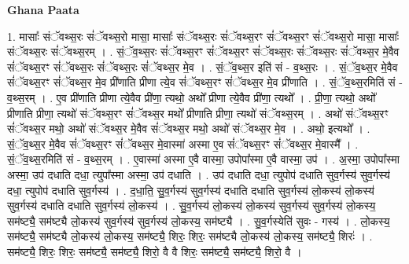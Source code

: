 \documentclass[17pt]{extarticle}
\begin{document}
\textbf{Ghana Paata } \newline

1. मासाः᳚ संॅवथ्स॒रः सं॑ॅवथ्स॒रो मासा॒ मासाः᳚ संॅवथ्स॒रः सं॑ॅवथ्स॒रꣳ सं॑ॅवथ्स॒रꣳ सं॑ॅवथ्स॒रो मासा॒ मासाः᳚ संॅवथ्स॒रः सं॑ॅवथ्स॒रम् । . सं॒ॅव॒थ्स॒रः सं॑ॅवथ्स॒रꣳ सं॑ॅवथ्स॒रꣳ सं॑ॅवथ्स॒रः सं॑ॅवथ्स॒रः सं॑ॅवथ्स॒र मे॒वैव सं॑ॅवथ्स॒रꣳ सं॑ॅवथ्स॒रः सं॑ॅवथ्स॒रः सं॑ॅवथ्स॒र मे॒व । . सं॒ॅव॒थ्स॒र इति॑ सं - व॒थ्स॒रः । . सं॒ॅव॒थ्स॒र मे॒वैव सं॑ॅवथ्स॒रꣳ सं॑ॅवथ्स॒र मे॒व प्री॑णाति प्रीणा त्ये॒व सं॑ॅवथ्स॒रꣳ सं॑ॅवथ्स॒र मे॒व प्री॑णाति । . सं॒ॅव॒थ्स॒रमिति॑ सं - व॒थ्स॒रम् । . ए॒व प्री॑णाति प्रीणा त्ये॒वैव प्री॑णा॒ त्यथो॒ अथो᳚ प्रीणा त्ये॒वैव प्री॑णा॒ त्यथो᳚ । . प्री॒णा॒ त्यथो॒ अथो᳚ प्रीणाति प्रीणा॒ त्यथो॑ संॅवथ्स॒रꣳ सं॑ॅवथ्स॒र मथो᳚ प्रीणाति प्रीणा॒ त्यथो॑ संॅवथ्स॒रम् । . अथो॑ संॅवथ्स॒रꣳ सं॑ॅवथ्स॒र मथो॒ अथो॑ संॅवथ्स॒र मे॒वैव सं॑ॅवथ्स॒र मथो॒ अथो॑ संॅवथ्स॒र मे॒व । . अथो॒ इत्यथो᳚ । . सं॒ॅव॒थ्स॒र मे॒वैव सं॑ॅवथ्स॒रꣳ सं॑ॅवथ्स॒र मे॒वास्मा॑ अस्मा ए॒व सं॑ॅवथ्स॒रꣳ सं॑ॅवथ्स॒र मे॒वास्मै᳚ । . सं॒ॅव॒थ्स॒रमिति॑ सं - व॒थ्स॒रम् । . ए॒वास्मा॑ अस्मा ए॒वै वास्मा॒ उपोपा᳚स्मा ए॒वै वास्मा॒ उप॑ । . अ॒स्मा॒ उपोपा᳚स्मा अस्मा॒ उप॑ दधाति दधा॒ त्युपा᳚स्मा अस्मा॒ उप॑ दधाति । . उप॑ दधाति दधा॒ त्युपोप॑ दधाति सुव॒र्गस्य॑ सुव॒र्गस्य॑ दधा॒ त्युपोप॑ दधाति सुव॒र्गस्य॑ । . द॒धा॒ति॒ सु॒व॒र्गस्य॑ सुव॒र्गस्य॑ दधाति दधाति सुव॒र्गस्य॑ लो॒कस्य॑ लो॒कस्य॑ सुव॒र्गस्य॑ दधाति दधाति सुव॒र्गस्य॑ लो॒कस्य॑ । . सु॒व॒र्गस्य॑ लो॒कस्य॑ लो॒कस्य॑ सुव॒र्गस्य॑ सुव॒र्गस्य॑ लो॒कस्य॒ सम॑ष्ट्यै॒ सम॑ष्ट्यै लो॒कस्य॑ सुव॒र्गस्य॑ सुव॒र्गस्य॑ लो॒कस्य॒ सम॑ष्ट्यै । . सु॒व॒र्गस्येति॑ सुवः - गस्य॑ । . लो॒कस्य॒ सम॑ष्ट्यै॒ सम॑ष्ट्यै लो॒कस्य॑ लो॒कस्य॒ सम॑ष्ट्यै॒ शिरः॒ शिरः॒ सम॑ष्ट्यै लो॒कस्य॑ लो॒कस्य॒ सम॑ष्ट्यै॒ शिरः॑ । . सम॑ष्ट्यै॒ शिरः॒ शिरः॒ सम॑ष्ट्यै॒ सम॑ष्ट्यै॒ शिरो॒ वै वै शिरः॒ सम॑ष्ट्यै॒ सम॑ष्ट्यै॒ शिरो॒ वै । \newline
\end{document}
